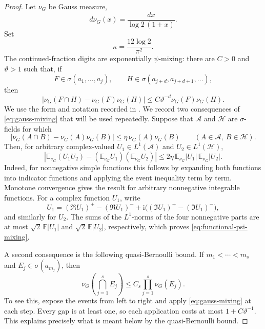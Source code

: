 \documentclass[11pt]{article}
\numberwithin{equation}{section}
\theoremstyle{definition}
\newcommand{\E}{\mathbb E}
\newcommand{\1}{\mathbf 1}
\newcommand{\ii}{\mathrm i}
\begin{document}
\begin{proof}
Let \(\nu_G\) be Gauss measure,
\[
 d\nu_G(x)=\frac{dx}{\log2\,(1+x)}.
\]
Set
\[
 \kappa=\frac{12\log2}{\pi^2}.
\]
The continued-fraction digits are exponentially \(\psi\)-mixing: there are
\(C>0\) and \(\vartheta>1\) such that, if
\[
 F\in\sigma(a_1,\ldots,a_j),\qquad
 H\in\sigma(a_{j+d},a_{j+d+1},\ldots),
\]
then
\begin{equation}\label{eq:gauss-mixing}
 |\nu_G(F\cap H)-\nu_G(F)\nu_G(H)|
 \le C\vartheta^{-d}\nu_G(F)\nu_G(H).
\end{equation}
We use the form and notation recorded in
\cite[(1.7)]{GhoshKirsebomRoy}.  We record two consequences of
\eqref{eq:gauss-mixing} that will be used repeatedly.  Suppose that
\(\mathscr A\) and \(\mathscr H\) are \(\sigma\)-fields for which
\[
 \left|\nu_G(A\cap B)-\nu_G(A)\nu_G(B)\right|
 \le \eta\,\nu_G(A)\nu_G(B)
 \qquad(A\in\mathscr A,\ B\in\mathscr H).
\]
Then, for arbitrary complex-valued
\(U_1\in L^1(\mathscr A)\) and \(U_2\in L^1(\mathscr H)\),
\begin{equation}\label{eq:functional-psi-mixing}
 \left|\E_{\nu_G}(U_1U_2)
       -(\E_{\nu_G}U_1)(\E_{\nu_G}U_2)\right|
 \le 2\eta\,\E_{\nu_G}|U_1|\,\E_{\nu_G}|U_2|.
\end{equation}
Indeed, for nonnegative simple functions this follows by expanding both
functions into indicator functions and applying the event inequality
term by term.  Monotone convergence gives the result for arbitrary
nonnegative integrable functions.  For a complex function \(U_1\), write
\[
 U_1=(\Re U_1)^+-(\Re U_1)^-
   +\ii\bigl((\Im U_1)^+-(\Im U_1)^-\bigr),
\]
and similarly for \(U_2\).  The sums of the \(L^1\)-norms of the
four nonnegative parts are at most \(\sqrt2\,\E|U_1|\) and
\(\sqrt2\,\E|U_2|\), respectively, which proves
\eqref{eq:functional-psi-mixing}.

A second consequence is the following quasi-Bernoulli bound.  If
\(m_1<\cdots<m_s\) and \(E_j\in\sigma(a_{m_j})\), then
\begin{equation}\label{eq:digit-quasi-bernoulli}
 \nu_G\left(\bigcap_{j=1}^sE_j\right)
 \le C_s\prod_{j=1}^s\nu_G(E_j).
\end{equation}
To see this, expose the events from left to right and apply
\eqref{eq:gauss-mixing} at each step.  Every gap is at least one, so
each application costs at most \(1+C\vartheta^{-1}\).  This explains
precisely what is meant below by the quasi-Bernoulli bound.


\end{proof}
\end{document}
